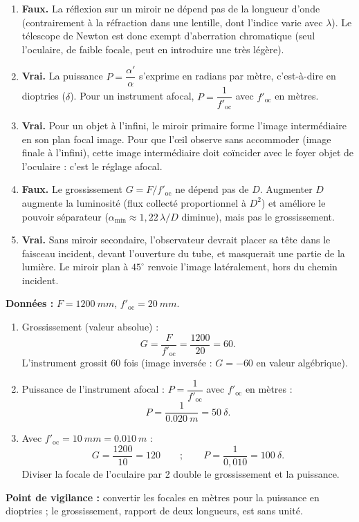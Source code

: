 \documentclass[11pt]{article}
\newcommand{\cle}[1]{{\popxbold\color{popdark}#1}}
\begin{document}
\begin{corrige}
\begin{enumerate}
    \item \textbf{Faux.} La réflexion sur un miroir ne dépend pas de la longueur d'onde (contrairement à la réfraction dans une lentille, dont l'indice varie avec $\lambda$). Le télescope de Newton est donc \cle{exempt d'aberration chromatique} (seul l'oculaire, de faible focale, peut en introduire une très légère).
    \item \textbf{Vrai.} La puissance $P = \dfrac{\alpha'}{\alpha}$ s'exprime en radians par mètre, c'est-à-dire en dioptries ($\delta$). Pour un instrument afocal, $P = \dfrac{1}{f'_{\text{oc}}}$ avec $f'_{\text{oc}}$ en mètres.
    \item \textbf{Vrai.} Pour un objet à l'infini, le miroir primaire forme l'image intermédiaire en son plan focal image. Pour que l'œil observe sans accommoder (image finale à l'infini), cette image intermédiaire doit coïncider avec le \cle{foyer objet de l'oculaire} : c'est le réglage \cle{afocal}.
    \item \textbf{Faux.} Le grossissement $G = F/f'_{\text{oc}}$ ne dépend pas de $D$. Augmenter $D$ augmente la \cle{luminosité} (flux collecté proportionnel à $D^2$) et améliore le \cle{pouvoir séparateur} ($\alpha_{\min} \approx 1,22\,\lambda/D$ diminue), mais pas le grossissement.
    \item \textbf{Vrai.} Sans miroir secondaire, l'observateur devrait placer sa tête dans le faisceau incident, devant l'ouverture du tube, et masquerait une partie de la lumière. Le miroir plan à $45^\circ$ renvoie l'image latéralement, hors du chemin incident.
\end{enumerate}
\end{corrige}

\begin{corrige}
\textbf{Données :} $F = \SI{1200}{mm}$, $f'_{\text{oc}} = \SI{20}{mm}$.
\begin{enumerate}
    \item Grossissement (valeur absolue) :
    \[ G = \frac{F}{f'_{\text{oc}}} = \frac{1200}{20} = 60. \]
    L'instrument grossit 60 fois (image inversée : $G = -60$ en valeur algébrique).
    \item Puissance de l'instrument afocal : $P = \dfrac{1}{f'_{\text{oc}}}$ avec $f'_{\text{oc}}$ en mètres :
    \[ P = \frac{1}{\SI{0,020}{m}} = \SI{50}{\delta}. \]
    \item Avec $f'_{\text{oc}} = \SI{10}{mm} = \SI{0,010}{m}$ :
    \[ G = \frac{1200}{10} = 120 \qquad ; \qquad P = \frac{1}{0,010} = \SI{100}{\delta}. \]
    Diviser la focale de l'oculaire par 2 double le grossissement et la puissance.
\end{enumerate}
\textbf{Point de vigilance :} convertir les focales en mètres pour la puissance en dioptries ; le grossissement, rapport de deux longueurs, est sans unité.
\end{corrige}
\end{document}
